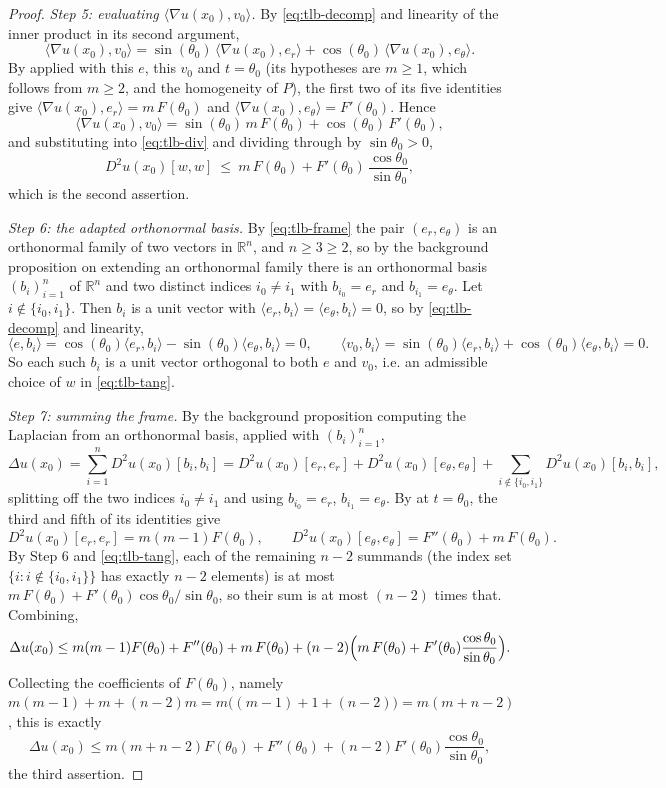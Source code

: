 \begin{proof}
\emph{Step 5: evaluating $\langle\nabla u(x_0),v_0\rangle$.} By
\eqref{eq:tlb-decomp} and linearity of the inner product in its second
argument,
\[
  \langle\nabla u(x_0),v_0\rangle
  =\sin(\theta_0)\,\langle\nabla u(x_0),e_r\rangle
   +\cos(\theta_0)\,\langle\nabla u(x_0),e_\theta\rangle .
\]
By  applied with this $e$, this $v_0$ and $t=\theta_0$
(its hypotheses are $m\ge1$, which follows from $m\ge2$, and the homogeneity of
$P$), the first two of its five identities give
$\langle\nabla u(x_0),e_r\rangle=m\,F(\theta_0)$ and
$\langle\nabla u(x_0),e_\theta\rangle=F'(\theta_0)$. Hence
\[
  \langle\nabla u(x_0),v_0\rangle
  =\sin(\theta_0)\,m\,F(\theta_0)+\cos(\theta_0)\,F'(\theta_0),
\]
and substituting into \eqref{eq:tlb-div} and dividing through by
$\sin\theta_0>0$,
\begin{equation}\label{eq:tlb-tang}
  D^2u(x_0)[w,w]\ \le\ m\,F(\theta_0)
    +F'(\theta_0)\,\frac{\cos\theta_0}{\sin\theta_0},
\end{equation}
which is the second assertion.

\emph{Step 6: the adapted orthonormal basis.} By \eqref{eq:tlb-frame} the pair
$(e_r,e_\theta)$ is an orthonormal family of two vectors in $\mathbb{R}^n$, and
$n\ge3\ge2$, so by the background proposition on extending an orthonormal family
there is an orthonormal basis $(b_i)_{i=1}^{n}$ of $\mathbb{R}^n$ and two
distinct indices $i_0\ne i_1$ with $b_{i_0}=e_r$ and $b_{i_1}=e_\theta$. Let
$i\notin\{i_0,i_1\}$. Then $b_i$ is a unit vector with
$\langle e_r,b_i\rangle=\langle e_\theta,b_i\rangle=0$, so by
\eqref{eq:tlb-decomp} and linearity,
\[
  \langle e,b_i\rangle=\cos(\theta_0)\langle e_r,b_i\rangle-\sin(\theta_0)\langle e_\theta,b_i\rangle=0,
  \qquad
  \langle v_0,b_i\rangle=\sin(\theta_0)\langle e_r,b_i\rangle+\cos(\theta_0)\langle e_\theta,b_i\rangle=0 .
\]
So each such $b_i$ is a unit vector orthogonal to both $e$ and $v_0$, i.e. an
admissible choice of $w$ in \eqref{eq:tlb-tang}.

\emph{Step 7: summing the frame.} By the background proposition computing the
Laplacian from an orthonormal basis, applied with $(b_i)_{i=1}^{n}$,
\[
  \Delta u(x_0)=\sum_{i=1}^{n}D^2u(x_0)[b_i,b_i]
  =D^2u(x_0)[e_r,e_r]+D^2u(x_0)[e_\theta,e_\theta]
   +\sum_{i\notin\{i_0,i_1\}}D^2u(x_0)[b_i,b_i],
\]
splitting off the two indices $i_0\ne i_1$ and using $b_{i_0}=e_r$,
$b_{i_1}=e_\theta$. By  at $t=\theta_0$, the third and
fifth of its identities give
\[
  D^2u(x_0)[e_r,e_r]=m(m-1)F(\theta_0),
  \qquad
  D^2u(x_0)[e_\theta,e_\theta]=F''(\theta_0)+m\,F(\theta_0).
\]
By Step 6 and \eqref{eq:tlb-tang}, each of the remaining $n-2$ summands (the
index set $\{i:i\notin\{i_0,i_1\}\}$ has exactly $n-2$ elements) is at most
$m\,F(\theta_0)+F'(\theta_0)\cos\theta_0/\sin\theta_0$, so their sum is at most
$(n-2)$ times that. Combining,
\[
  \Delta u(x_0)\le m(m-1)F(\theta_0)+F''(\theta_0)+m\,F(\theta_0)
    +(n-2)\Bigl(m\,F(\theta_0)+F'(\theta_0)\frac{\cos\theta_0}{\sin\theta_0}\Bigr).
\]
Collecting the coefficients of $F(\theta_0)$, namely
$m(m-1)+m+(n-2)m=m\bigl((m-1)+1+(n-2)\bigr)=m(m+n-2)$, this is exactly
\[
  \Delta u(x_0)\le m(m+n-2)F(\theta_0)+F''(\theta_0)
    +(n-2)F'(\theta_0)\frac{\cos\theta_0}{\sin\theta_0},
\]
the third assertion.
\end{proof}
